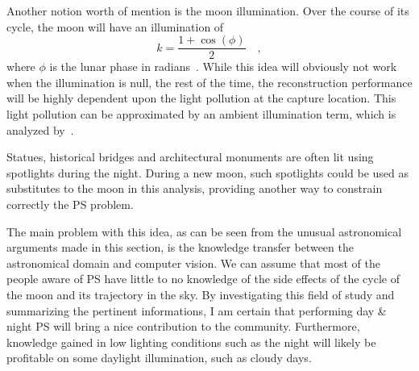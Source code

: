 Another notion worth of mention is the moon illumination. Over the course of its cycle, the moon will have an illumination of
\begin{equation}
k = \frac{1 + \cos(\phi)}{2}  \quad,
\end{equation}
where $\phi$ is the lunar phase in radians~\cite{Meeus1991}. While this idea will obviously not work when the illumination is null, the rest of the time, the reconstruction performance will be highly dependent upon the light pollution at the capture location. This light pollution can be approximated by an ambient illumination term, which is analyzed by~\cite{Angelopoulou2013}.

Statues, historical bridges and architectural monuments are often lit using spotlights during the night. During a new moon, such spotlights could be used as substitutes to the moon in this analysis, providing another way to constrain correctly the PS problem.

The main problem with this idea, as can be seen from the unusual astronomical arguments made in this section, is the knowledge transfer between the astronomical domain and computer vision. We can assume that most of the people aware of PS have little to no knowledge of the side effects of the cycle of the moon and its trajectory in the sky. By investigating this field of study and summarizing the pertinent informations, I am certain that performing day \& night PS will bring a nice contribution to the community. Furthermore, knowledge gained in low lighting conditions such as the night will likely be profitable on some daylight illumination, such as cloudy days.











